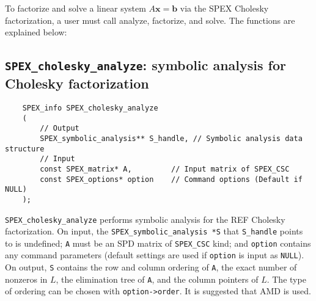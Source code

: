\documentclass[12pt,oneside]{book}
\theoremstyle{definition}
\begin{document}
To factorize and solve a linear system $A \mathbf{x} = \mathbf{b}$ via the SPEX Cholesky factorization, a user must call analyze, factorize, and solve. The functions are explained below:


\newpage
\subsection{\texttt{SPEX\_cholesky\_analyze}: symbolic analysis for Cholesky factorization} \label{ss:spex_chol_analyze}
\begin{mdframed}[userdefinedwidth=\textwidth]
{\footnotesize
\begin{verbatim}
    SPEX_info SPEX_cholesky_analyze
    (
        // Output
        SPEX_symbolic_analysis** S_handle, // Symbolic analysis data structure 
        // Input
        const SPEX_matrix* A,         // Input matrix of SPEX_CSC
        const SPEX_options* option    // Command options (Default if NULL)
    );
    \end{verbatim}
} \end{mdframed}

\verb|SPEX_cholesky_analyze| performs symbolic analysis for the REF Cholesky factorization. On input, the \verb|SPEX_symbolic_analysis *S| that  \verb|S_handle| points to is undefined;  \verb|A| must be an SPD matrix of \verb|SPEX_CSC| kind;  and \verb|option| contains any command parameters  (default settings are used if
\verb|option| is input as \verb|NULL|). On output, \verb|S| contains the row and column ordering of \verb|A|, the exact number of nonzeros in $L$, the elimination tree of \verb|A|, and the column pointers of $L$. The type of ordering can be chosen with \verb|option->order|. It is suggested that AMD is used.



\end{document}
